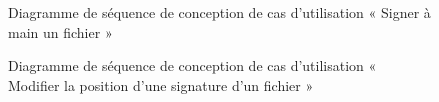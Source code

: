 \begin{figure}[H]
  \centering
  \caption{Diagramme de séquence de conception de cas d'utilisation « Signer à main un fichier »}
  \label{fig:sequence_conception_sign_by_hand}
\end{figure}

\begin{figure}[H]
  \centering
  \caption{Diagramme de séquence de conception de cas d'utilisation « Modifier la position d'une signature d'un fichier »}
  \label{fig:sequence_conception_move_signature}
\end{figure}

